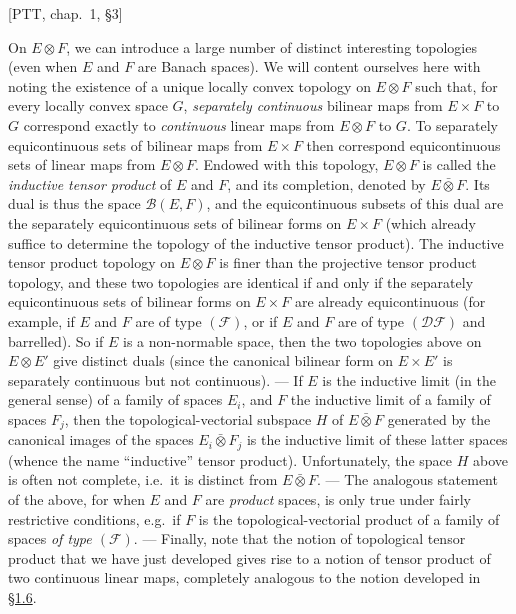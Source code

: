 \documentclass[british]{article}
\newcommand{\oldpage}[1]{\marginpar{\footnotesize$\Big\vert$ \textit{p.~#1}}}
\begin{document}
{[}PTT, chap.~1, §3{]}

On \(E\otimes F\), we can introduce a large number of distinct
interesting topologies (even when \(E\) and \(F\) are Banach spaces). We
will content ourselves here with noting the existence of a unique
locally convex topology on \(E\otimes F\) such that, for every locally
convex space \(G\), \emph{separately continuous} bilinear maps from
\(E\times F\) to \(G\) correspond exactly to \emph{continuous} linear
maps from \(E\otimes F\) to \(G\). To separately equicontinuous sets of
bilinear maps from \(E\times F\) then correspond equicontinuous sets of
linear maps from \(E\otimes F\). \oldpage{93} Endowed with this
topology, \(E\otimes F\) is called the \emph{inductive tensor product}
of \(E\) and \(F\), and its completion, denoted by \(E\bar{\otimes}F\).
Its dual is thus the space \(\mathscr{B}(E,F)\), and the equicontinuous
subsets of this dual are the separately equicontinuous sets of bilinear
forms on \(E\times F\) (which already suffice to determine the topology
of the inductive tensor product). The inductive tensor product topology
on \(E\otimes F\) is finer than the projective tensor product topology,
and these two topologies are identical if and only if the separately
equicontinuous sets of bilinear forms on \(E\times F\) are already
equicontinuous (for example, if \(E\) and \(F\) are of type
\((\mathscr{F})\), or if \(E\) and \(F\) are of type \((\mathscr{DF})\)
and barrelled). So if \(E\) is a non-normable space, then the two
topologies above on \(E\otimes E'\) give distinct duals (since the
canonical bilinear form on \(E\times E'\) is separately continuous but
not continuous). --- If \(E\) is the inductive limit (in the general
sense) of a family of spaces \(E_i\), and \(F\) the inductive limit of a
family of spaces \(F_j\), then the topological-vectorial subspace \(H\)
of \(E\bar{\otimes}F\) generated by the canonical images of the spaces
\(E_i\bar{\otimes}F_j\) is the inductive limit of these latter spaces
(whence the name ``inductive'' tensor product). Unfortunately, the space
\(H\) above is often not complete, i.e.~it is distinct from
\(E\bar{\otimes}F\). --- The analogous statement of the above, for when
\(E\) and \(F\) are \emph{product} spaces, is only true under fairly
restrictive conditions, e.g.~if \(F\) is the topological-vectorial
product of a family of spaces \emph{of type \((\mathscr{F})\)}. ---
Finally, note that the notion of topological tensor product that we have
just developed gives rise to a notion of tensor product of two
continuous linear maps, completely analogous to the notion developed in
\hyperref[section-1.6]{§1.6}.
\end{document}
